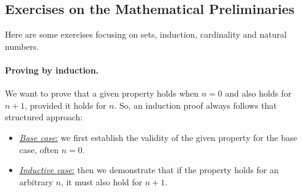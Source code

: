 \documentclass{article}
\begin{document}
		\subsection{Exercises on the Mathematical Preliminaries}
			Here are some exercises focusing on sets, induction, cardinality and natural numbers.\\
			\begin{pane}
				\paragraph{Proving by induction.}
				We want to prove that a given property  holds when $n=0$ and also holds for $n+1$, provided it holds for $n$. So, an induction proof always follows that structured approach:
				\begin{itemize}
					\item \uline{\textit{Base case}:} we first establish the validity of the given property for the base case, often \uline{$n=0$}.
					\item \uline{\textit{Inductive case}:} then we demonstrate that if the property holds for an arbitrary $n$, it must also hold for \uline{$n+1$}.
				\end{itemize}
			\end{pane}
\end{document}
